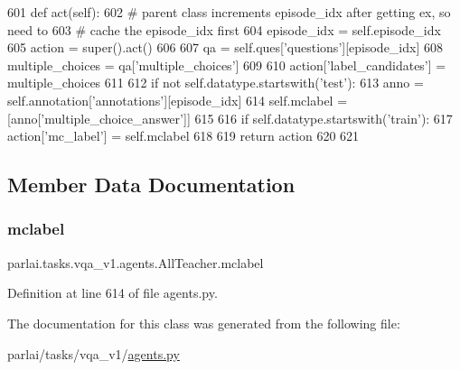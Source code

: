 \begin{DoxyCode}
601     \textcolor{keyword}{def }act(self):
602         \textcolor{comment}{# parent class increments episode\_idx after getting ex, so need to}
603         \textcolor{comment}{# cache the episode\_idx first}
604         episode\_idx = self.episode\_idx
605         action = super().act()
606 
607         qa = self.ques[\textcolor{stringliteral}{'questions'}][episode\_idx]
608         multiple\_choices = qa[\textcolor{stringliteral}{'multiple\_choices'}]
609 
610         action[\textcolor{stringliteral}{'label\_candidates'}] = multiple\_choices
611 
612         \textcolor{keywordflow}{if} \textcolor{keywordflow}{not} self.datatype.startswith(\textcolor{stringliteral}{'test'}):
613             anno = self.annotation[\textcolor{stringliteral}{'annotations'}][episode\_idx]
614             self.mclabel = [anno[\textcolor{stringliteral}{'multiple\_choice\_answer'}]]
615 
616         \textcolor{keywordflow}{if} self.datatype.startswith(\textcolor{stringliteral}{'train'}):
617             action[\textcolor{stringliteral}{'mc\_label'}] = self.mclabel
618 
619         \textcolor{keywordflow}{return} action
620 
621 
\end{DoxyCode}


\subsection{Member Data Documentation}
\mbox{\label{classparlai_1_1tasks_1_1vqa__v1_1_1agents_1_1AllTeacher_a195e6128ad37b6d0428866745c0490e3}} 
\subsubsection{\texorpdfstring{mclabel}{mclabel}}
{\footnotesize\ttfamily parlai.\+tasks.\+vqa\+\_\+v1.\+agents.\+All\+Teacher.\+mclabel}



Definition at line 614 of file agents.\+py.



The documentation for this class was generated from the following file\+:\begin{DoxyCompactItemize}
\item 
parlai/tasks/vqa\+\_\+v1/\hyperlink{parlai_2tasks_2vqa__v1_2agents_8py}{agents.\+py}\end{DoxyCompactItemize}
